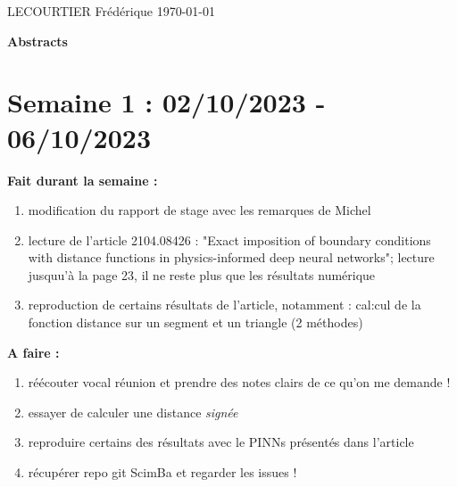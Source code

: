 \documentclass[french]{article}
\begin{document}
	LECOURTIER Frédérique \hfill \today
	\begin{center}
		\Large\textbf{{Abstracts}}
	\end{center}
\section{Semaine 1 : 02/10/2023 - 06/10/2023}
	\textbf{Fait durant la semaine :}
	\begin{enumerate}[label=\textbullet]
		\item modification du rapport de stage avec les remarques de Michel
		\item lecture de l'article 2104.08426 : "Exact imposition of boundary conditions with distance functions in physics-informed deep neural networks"; lecture jusquu'à la page 23, il ne reste plus que les résultats numérique
		\item reproduction de certains résultats de l'article, notamment : cal:cul de la fonction distance sur un segment et un triangle (2 méthodes)
	\end{enumerate}

	\textbf{A faire :}
	\begin{enumerate}[label=\textbullet]
		\item réécouter vocal réunion et prendre des notes clairs de ce qu'on me demande !
		\item essayer de calculer une distance \textit{signée}
		\item reproduire certains des résultats avec le PINNs présentés dans l'article
		\item récupérer repo git ScimBa et regarder les issues !
	\end{enumerate}
\end{document}
